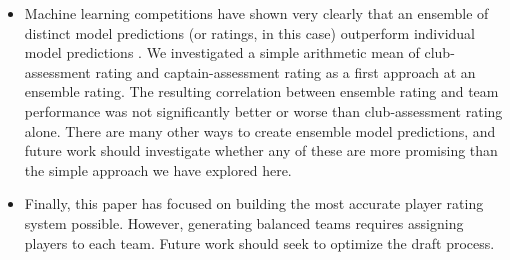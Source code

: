 \begin{itemize}
\item Machine learning competitions have shown very clearly that an ensemble of distinct model predictions (or ratings, in this case) outperform individual model predictions \cite{mlwave}. We investigated a simple arithmetic mean of club-assessment rating and captain-assessment rating as a first approach at an ensemble rating. The resulting correlation between ensemble rating and team performance was not significantly better or worse than club-assessment rating alone. There are many other ways to create ensemble model predictions, and future work should investigate whether any of these are more promising than the simple approach we have explored here.

\item Finally, this paper has focused on building the most accurate player rating system possible. However, generating balanced teams requires assigning players to each team. Future work should seek to optimize the draft process. 

\end{itemize}